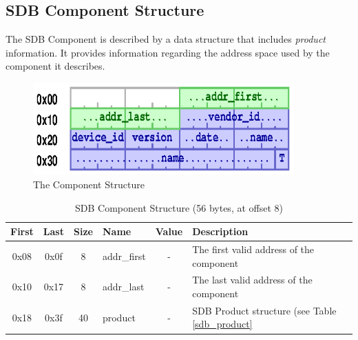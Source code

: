 \documentclass[a4paper, 12pt]{article}
\begin{document}
\pagebreak 

\subsection{SDB Component Structure}

The SDB Component is described by a data structure that includes \textit{product}
information. It provides information regarding the address space used by the
component it describes.

\begin{figure}[h]
\centering%
\includegraphics[width=100mm]{img/sdb-component.ps}
\caption{The Component Structure}
\label{fig:FigureComponent}
\end{figure}

\begin{center}
  \begin{savenotes}
    \begin{table}[!ht]\footnotesize
      \caption{SDB Component Structure (56 bytes, at offset 8)}\label{sdb_component}\centering
        \begin{tabular}{| c | c | c | l | c | p{5cm} |} \hline
        First & Last & Size & Name & Value & Description \\ \hline
        0x08 & 0x0f & 8 & addr\_first & - & The first valid address of the component \\ \hline
        0x10 & 0x17 & 8 & addr\_last & - & The last valid address of the component \\ \hline
        0x18 & 0x3f & 40 & product & - & SDB Product structure (see Table \ref{sdb_product} \\ \hline
        \end{tabular}
    \end{table}
  \end{savenotes}
\end{center}
\end{document}
